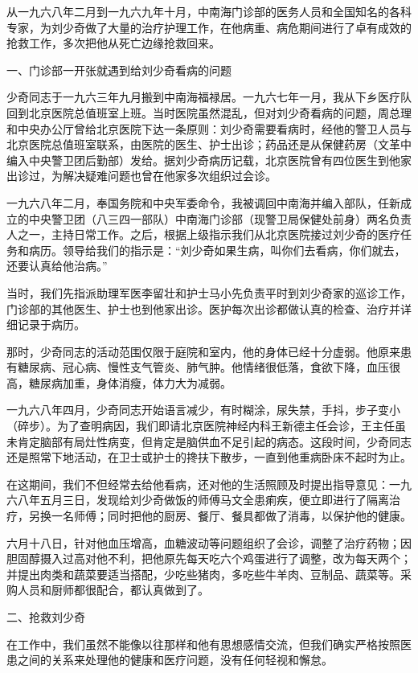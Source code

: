 \begin{maonote}
从一九六八年二月到一九六九年十月，中南海门诊部的医务人员和全国知名的各科专家，为刘少奇做了大量的治疗护理工作，在他病重、病危期间进行了卓有成效的抢救工作，多次把他从死亡边缘抢救回来。

一、门诊部一开张就遇到给刘少奇看病的问题

少奇同志于一九六三年九月搬到中南海福禄居。一九六七年一月，我从下乡医疗队回到北京医院总值班室上班。当时医院虽然混乱，但对刘少奇看病的问题，周总理和中央办公厅曾给北京医院下达一条原则：刘少奇需要看病时，经他的警卫人员与北京医院总值班室联系，由医院的医生、护士出诊；药品还是从保健药房（文革中编入中央警卫团后勤部）发给。据刘少奇病历记载，北京医院曾有四位医生到他家出诊过，为解决疑难问题也曾在他家多次组织过会诊。

一九六八年二月，奉国务院和中央军委命令，我被调回中南海并编入部队，任新成立的中央警卫团（八三四一部队）中南海门诊部（现警卫局保健处前身）两名负责人之一，主持日常工作。之后，根据上级指示我们从北京医院接过刘少奇的医疗任务和病历。领导给我们的指示是：“刘少奇如果生病，叫你们去看病，你们就去，还要认真给他治病。”

当时，我们先指派助理军医李留壮和护士马小先负责平时到刘少奇家的巡诊工作，门诊部的其他医生、护士也到他家出诊。医护每次出诊都做认真的检查、治疗并详细记录于病历。

那时，少奇同志的活动范围仅限于庭院和室内，他的身体已经十分虚弱。他原来患有糖尿病、冠心病、慢性支气管炎、肺气肿。他情绪很低落，食欲下降，血压很高，糖尿病加重，身体消瘦，体力大为减弱。

一九六八年四月，少奇同志开始语言减少，有时糊涂，尿失禁，手抖，步子变小（碎步）。为了查明病因，我们即请北京医院神经内科王新德主任会诊，王主任虽未肯定脑部有局灶性病变，但肯定是脑供血不足引起的病态。这段时间，少奇同志还是照常下地活动，在卫士或护士的搀扶下散步，一直到他重病卧床不起时为止。

在这期间，我们不但经常去给他看病，还对他的生活照顾及时提出指导意见：一九六八年五月三日，发现给刘少奇做饭的师傅马文全患痢疾，便立即进行了隔离治疗，另换一名师傅；同时把他的厨房、餐厅、餐具都做了消毒，以保护他的健康。

六月十八日，针对他血压增高，血糖波动等问题组织了会诊，调整了治疗药物；因胆固醇摄入过高对他不利，把他原先每天吃六个鸡蛋进行了调整，改为每天两个；并提出肉类和蔬菜要适当搭配，少吃些猪肉，多吃些牛羊肉、豆制品、蔬菜等。采购人员和厨师都很配合，都认真做到了。

二、抢救刘少奇

在工作中，我们虽然不能像以往那样和他有思想感情交流，但我们确实严格按照医患之间的关系来处理他的健康和医疗问题，没有任何轻视和懈怠。


\end{maonote}
